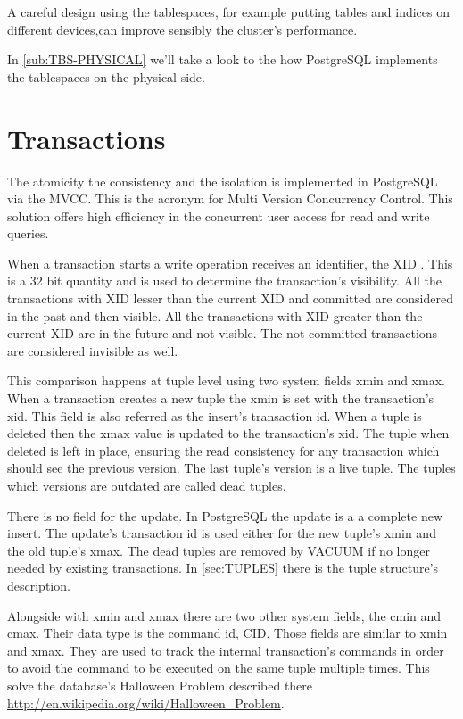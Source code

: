 A careful design using the tablespaces, for example putting tables and indices on different
devices,can improve sensibly the cluster's performance.\newline

In \ref{sub:TBS-PHYSICAL} we'll take a look to the how PostgreSQL implements the tablespaces on the
physical side.


\section{Transactions}
\label{sec:TRANSACTION}
The atomicity the consistency and the isolation is implemented in PostgreSQL via the
MVCC. This is the acronym for Multi Version Concurrency Control. This solution offers high efficiency in the concurrent user access for read
and write queries.\newline 

When a transaction starts a write operation receives an identifier, the XID . This is
a 32 bit quantity and is used to determine the transaction's visibility. All the transactions with
XID lesser than the current XID and committed are considered in the past and then visible. All the
transactions with XID greater than the current XID are in the future and not
visible. The not committed transactions are considered invisible as well.\newline

This comparison happens at tuple level using two system fields xmin and xmax. When a transaction
creates a new tuple the xmin is set with the transaction's xid. This field is also referred as the
insert's transaction id. When a tuple is deleted then the xmax value is updated to the transaction's
xid. The tuple when deleted is left in place, ensuring the read consistency for any transaction
which should see the previous version. The last tuple's version is a live tuple. The tuples which
versions are outdated are called dead tuples.\newline

There is no field for the update. In PostgreSQL the update is a a complete new insert. The update's
transaction id is used either for the new tuple's xmin and the old tuple's xmax. The dead tuples are
removed by VACUUM if no longer needed by existing transactions. In \ref{sec:TUPLES}
there is the tuple structure's description.\newline

Alongside with xmin and xmax there are two other system fields, the cmin and cmax. Their data
type is the command id, CID. Those fields are similar to xmin and xmax. They are used to track the
internal transaction's commands in order to avoid the command to be executed on the same
tuple multiple times. This solve the database's Halloween Problem described there
\href{http://en.wikipedia.org/wiki/Halloween_Problem}{
http://en.wikipedia.org/wiki/Halloween\_Problem}.\newline

